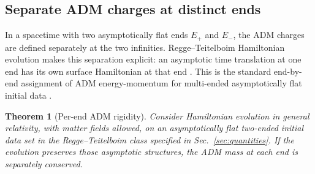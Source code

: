 \documentclass[aps,prd,10pt,onecolumn,nofootinbib,superscriptaddress,floatfix]{revtex4-2}
\newtheorem{theorem}{Theorem}
\begin{document}
\subsection{Separate ADM charges at distinct ends}

In a spacetime with two asymptotically flat ends $E_+$ and $E_-$, the ADM
charges are defined separately at the two infinities.  Regge--Teitelboim
Hamiltonian evolution makes this separation explicit: an asymptotic time
translation at one end has its own surface Hamiltonian at that end
\cite{ReggeTeitelboim1974SurfaceIntegrals}.  This is the standard end-by-end
assignment of ADM energy-momentum for multi-ended asymptotically flat initial
data
\cite{ArnowittDeserMisner1962Dynamics,Wald1984GeneralRelativity,Bartnik1986Mass}.

\begin{theorem}[Per-end ADM rigidity]
\label{thm:adm-rigidity}
Consider Hamiltonian evolution in general relativity, with matter fields
allowed, on an asymptotically flat two-ended initial data set in the
Regge--Teitelboim class specified in Sec.~\ref{sec:quantities}.  If the
evolution preserves those asymptotic structures, the ADM mass at each end is
separately conserved.
\end{theorem}
\end{document}
